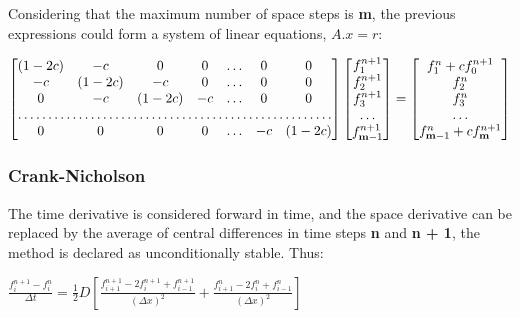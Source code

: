 \documentclass[12pt]{report}
\begin{document}
\par Considering that the maximum number of space steps is \textbf{m}, the previous expressions could form a system of linear equations, $A.x = r$:
\begin{center}
$
\begin{bmatrix}
    (1 - 2c) & -c & 0 & 0 & \dots & 0 & 0 \\
    -c & (1 - 2c) & -c & 0 & \dots & 0 & 0 \\
    0 & -c & (1 - 2c) & -c & \dots & 0 & 0 \\
    \hdotsfor{7} \\
    0 & 0 & 0 & 0 & \dots & -c & (1 - 2c) \\
\end{bmatrix}
\begin{bmatrix}
    f_1^{n + 1} \\
    f_2^{n + 1} \\
    f_3^{n + 1} \\
    \dots \\
    f_{\textbf{m} - 1}^{n + 1} \\
\end{bmatrix}
=
\begin{bmatrix}
    f_1^{n} + c f_0^{n + 1} \\
    f_2^{n} \\
    f_3^{n} \\
    \dots \\
    f_{\textbf{m} - 1}^{n} + c f_{\textbf{m}}^{n + 1} \\
\end{bmatrix}
$
\end{center}


\subsubsection*{Crank-Nicholson}
\par The time derivative is considered forward in time, and the space derivative can be replaced by the average of central differences in time steps \textbf{n} and \textbf{n + 1}, the method is declared as unconditionally stable. Thus:

\begin{center}
\Large
$
\frac{f_i^{n + 1} - f_i^{n}}{\Delta t} = \frac{1}{2} D {\left[\frac{f_{i + 1}^{n + 1} - 2f_{i}^{n + 1} + f_{i - 1}^{n + 1}}{(\Delta x)^2} + \frac{f_{i + 1}^{n} - 2f_{i}^{n} + f_{i - 1}^{n}}{(\Delta x)^2}\right]}
$
\end{center}
\end{document}
